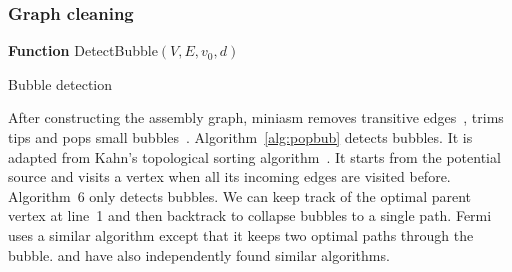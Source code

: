 \documentclass{bioinfo}
\begin{document}
\begin{methods}
\subsubsection{Graph cleaning}

\begin{algorithm}[tb]
\DontPrintSemicolon
\footnotesize
{}
\BlankLine
\textbf{Function} {\sc DetectBubble}$(V,E,v_0,d)$
\caption{Bubble detection}\label{alg:popbub}
\end{algorithm}

After constructing the assembly graph, miniasm removes transitive
edges~\citep{Myers:2005bh}, trims tips and pops small
bubbles~\citep{Zerbino:2008uq}. Algorithm~\ref{alg:popbub} detects bubbles. It is
adapted from Kahn's topological sorting algorithm~\citep{Kahn62aa}. It starts
from the potential source and visits a vertex when all its incoming edges are
visited before. Algorithm~6 only detects bubbles. We can keep track of the
optimal parent vertex at line~1 and then backtrack to collapse bubbles to a
single path. Fermi~\citep{Li:2012fk} uses a similar algorithm except that it
keeps two optimal paths through the bubble.  \citet{DBLP:conf/wabi/OnoderaSS13}
and \citet{TCS15} have also independently found similar algorithms.


\end{methods}
\end{document}
